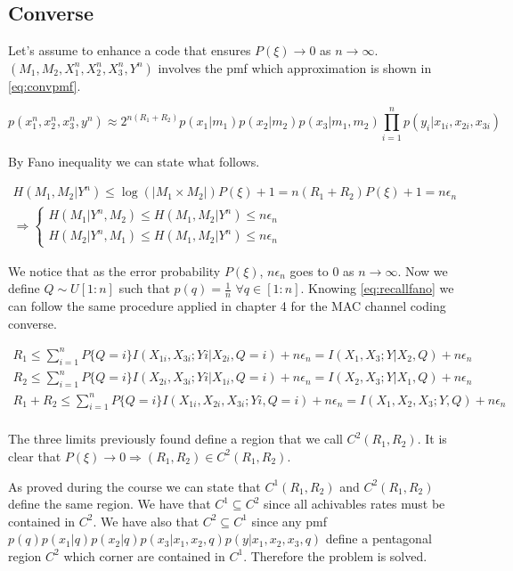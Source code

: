 \subsection{Converse}

Let's assume to enhance a code that ensures $P(\xi) \rightarrow 0$ as $n \rightarrow \infty$. $(M_1,M_2,X_1^n,X_2^n,X_3^n,Y^n)$ involves the pmf which approximation is shown in \eqref{eq:convpmf}.

\begin{equation}
	p(x_1^n,x_2^n,x_3^n,y^n)\approx2^{n(R_1+R_2)}p(x_1|m_1)p(x_2|m_2)p(x_3|m_1,m_2)\prod_{i=1}^n p(y_i|x_{1i},x_{2i},x_{3i})
	\label{eq:convpmf}
\end{equation}

By Fano inequality we can state what follows.

\begin{equation}
	\begin{gathered}
		H(M_1,M_2|Y^n) \leq \log(|M_1\times M_2|)P(\xi)+1 = n(R_1+R_2)P(\xi)+1 = n\epsilon_n\\
		\Rightarrow
		\begin{cases}
			H(M_1|Y^n,M_2) \leq H(M_1,M_2|Y^n) \leq n\epsilon_n \\
			H(M_2|Y^n,M_1) \leq H(M_1,M_2|Y^n) \leq n\epsilon_n
		\end{cases}
	\end{gathered}
	\label{eq:recallfano}
\end{equation}

We notice that as the error probability $P(\xi)$, $n\epsilon_n$ goes to $0$ as $n \rightarrow \infty$. Now we define $Q \sim U[1:n]$ such that $p(q)=\frac{1}{n}$ $\forall q \in [1:n]$. Knowing \eqref{eq:recallfano} we can follow the same procedure applied in chapter 4 for the MAC channel coding converse.

\begin{equation}
	\begin{gathered}
		R_1 \leq \sum_{i=1}^n P\{Q=i\} I(X_{1i},X_{3i};Yi|X_{2i},Q=i) + n\epsilon_n = I(X_{1},X_{3};Y|X_{2},Q)+n\epsilon_n\\
		R_2 \leq \sum_{i=1}^n P\{Q=i\} I(X_{2i},X_{3i};Yi|X_{1i}, Q=i) + n\epsilon_n = I(X_{2},X_{3};Y|X_{1},Q)+n\epsilon_n\\
		R_1 + R_2 \leq \sum_{i=1}^n P\{Q=i\}I(X_{1i},X_{2i},X_{3i};Yi, Q=i) + n\epsilon_n = I(X_{1},X_{2},X_{3};Y,Q)+n\epsilon_n \\
	\end{gathered}
\end{equation}

The three limits previously found define a region that we call $C^2(R_1,R_2)$. It is clear that $ P(\xi) \rightarrow 0 \Rightarrow (R_1,R_2) \in C^2(R_1, R_2)$.

As proved during the course we can state that $C^1(R_1,R_2)$ and $C^2(R_1,R_2)$ define the same region. We have that $C^1 \subseteq C^2$ since all achivables rates must be contained in $C^2$. We have also that $C^2 \subseteq C^1$ since any pmf $p(q)p(x_1|q)p(x_2|q)p(x_3|x_1,x_2,q)p(y|x_1,x_2,x_3,q)$ define a pentagonal region $C^2$ which corner are contained in $C^1$. Therefore the problem is solved.
